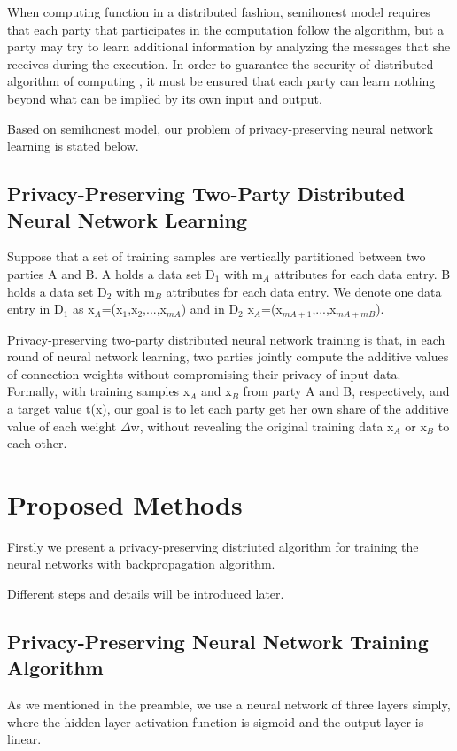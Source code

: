 \documentclass[twoside,twocolumn]{article}
\begin{document}
When computing function in a distributed fashion, semihonest model requires that each party that participates in the computation follow the algorithm, but a party may try to learn additional information by analyzing the messages that she receives during the execution. In order to guarantee the security of distributed algorithm of computing , it must be ensured that each party can learn nothing beyond what can be implied by its own input and
output.

Based on semihonest model, our problem of privacy-preserving neural network learning is stated below.

\subsection{Privacy-Preserving Two-Party Distributed Neural Network Learning}
Suppose that a set of training samples are vertically partitioned between two parties A and B. A holds a data set D$_1$ with m$_A$ attributes for each data entry. B holds a data set D$_2$ with m$_B$ attributes for each data entry. We denote one data entry in D$_1$ as x$_A$=(x$_1$,x$_2$,...,x$_{mA}$) and in D$_2$ x$_A$=(x$_{mA+1}$,...,x$_{mA+mB}$).

Privacy-preserving two-party distributed neural network training is that, in each round of neural network learning, two parties jointly compute the additive values of connection weights without compromising their privacy of input data. Formally, with training samples x$_A$ and x$_B$ from party A and B, respectively, and a target value t(x),  our goal is to let each party get her own share of the additive value of each weight $\Delta$w, without revealing the original training data x$_A$ or x$_B$ to each other.

\section{Proposed Methods}
Firstly we present a privacy-preserving distriuted algorithm for training the neural networks with backpropagation algorithm.

Different steps and details will be introduced later.
\subsection{Privacy-Preserving Neural Network Training Algorithm}
As we mentioned in the preamble, we use a neural network of three layers simply, where the hidden-layer activation function is sigmoid and the output-layer is linear.
\end{document}

